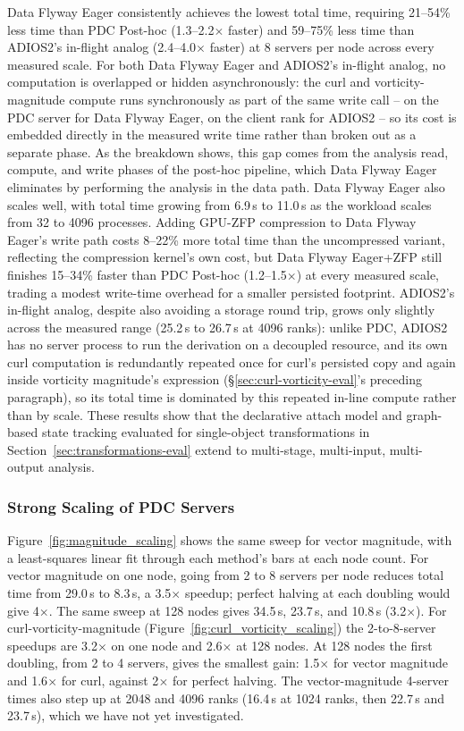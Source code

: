 Data Flyway Eager consistently achieves the lowest total time, requiring 21--54\% less time than PDC Post-hoc (1.3--2.2$\times$ faster) and 59--75\% less time than ADIOS2's in-flight analog (2.4--4.0$\times$ faster) at 8 servers per node across every measured scale. For both Data Flyway Eager and ADIOS2's in-flight analog, no computation is overlapped or hidden asynchronously: the curl and vorticity-magnitude compute runs synchronously as part of the same write call -- on the PDC server for Data Flyway Eager, on the client rank for ADIOS2 -- so its cost is embedded directly in the measured write time rather than broken out as a separate phase. As the breakdown shows, this gap comes from the analysis read, compute, and write phases of the post-hoc pipeline, which Data Flyway Eager eliminates by performing the analysis in the data path. Data Flyway Eager also scales well, with total time growing from 6.9\,s to 11.0\,s as the workload scales from 32 to 4096 processes. Adding GPU-ZFP compression to Data Flyway Eager's write path costs 8--22\% more total time than the uncompressed variant, reflecting the compression kernel's own cost, but Data Flyway Eager+ZFP still finishes 15--34\% faster than PDC Post-hoc (1.2--1.5$\times$) at every measured scale, trading a modest write-time overhead for a smaller persisted footprint. ADIOS2's in-flight analog, despite also avoiding a storage round trip, grows only slightly across the measured range (25.2\,s to 26.7\,s at 4096 ranks): unlike PDC, ADIOS2 has no server process to run the derivation on a decoupled resource, and its own curl computation is redundantly repeated once for curl's persisted copy and again inside vorticity magnitude's expression (\S\ref{sec:curl-vorticity-eval}'s preceding paragraph), so its total time is dominated by this repeated in-line compute rather than by scale. These results show that the declarative attach model and graph-based state tracking evaluated for single-object transformations in Section~\ref{sec:transformations-eval} extend to multi-stage, multi-input, multi-output analysis.

\subsubsection{Strong Scaling of PDC Servers}
\label{sec:server-scaling-eval}

Figure~\ref{fig:magnitude_scaling} shows the same sweep for vector magnitude, with a least-squares linear fit through each method's bars at each node count. For vector magnitude on one node, going from 2 to 8 servers per node reduces total time from 29.0\,s to 8.3\,s, a 3.5$\times$ speedup; perfect halving at each doubling would give 4$\times$. The same sweep at 128 nodes gives 34.5\,s, 23.7\,s, and 10.8\,s (3.2$\times$). For curl-vorticity-magnitude (Figure~\ref{fig:curl_vorticity_scaling}) the 2-to-8-server speedups are 3.2$\times$ on one node and 2.6$\times$ at 128 nodes. At 128 nodes the first doubling, from 2 to 4 servers, gives the smallest gain: 1.5$\times$ for vector magnitude and 1.6$\times$ for curl, against 2$\times$ for perfect halving. The vector-magnitude 4-server times also step up at 2048 and 4096 ranks (16.4\,s at 1024 ranks, then 22.7\,s and 23.7\,s), which we have not yet investigated. 

